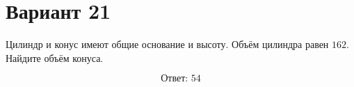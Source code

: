 \documentclass[12pt,a4paper]{article}
\begin{document}
\section*{Вариант 21}

Цилиндр и конус имеют общие основание и высоту.
Объём цилиндра равен \(162\).
Найдите объём конуса.

\begin{center}
\end{center}

\[
\boxed{\text{Ответ: }54}
\]
\end{document}
